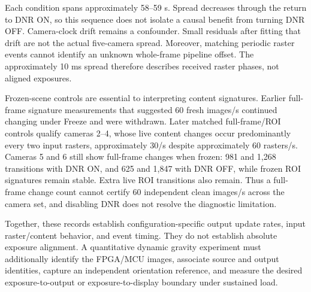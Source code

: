 Each condition spans approximately 58--59 s. Spread decreases through the return to DNR ON, so this sequence does not isolate a causal benefit from turning DNR OFF. Camera-clock drift remains a confounder. Small residuals after fitting that drift are not the actual five-camera spread. Moreover, matching periodic raster events cannot identify an unknown whole-frame pipeline offset. The approximately 10 ms spread therefore describes received raster phases, not aligned exposures.

Frozen-scene controls are essential to interpreting content signatures. Earlier full-frame signature measurements that suggested 60 fresh images/s continued changing under Freeze and were withdrawn. Later matched full-frame/ROI controls qualify cameras 2--4, whose live content changes occur predominantly every two input rasters, approximately 30/s despite approximately 60 rasters/s. Cameras 5 and 6 still show full-frame changes when frozen: 981 and 1,268 transitions with DNR ON, and 625 and 1,847 with DNR OFF, while frozen ROI signatures remain stable. Extra live ROI transitions also remain. Thus a full-frame change count cannot certify 60 independent clean images/s across the camera set, and disabling DNR does not resolve the diagnostic limitation.

Together, these records establish configuration-specific output update rates, input raster/content behavior, and event timing. They do not establish absolute exposure alignment. A quantitative dynamic gravity experiment must additionally identify the FPGA/MCU images, associate source and output identities, capture an independent orientation reference, and measure the desired exposure-to-output or exposure-to-display boundary under sustained load.
